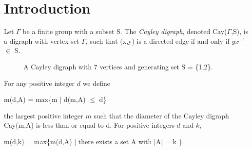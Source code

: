 \section{Introduction}

Let $\Gamma$ be a finite group with a subset S. The \emph{Cayley digraph}, denoted Cay($\Gamma$,S), is a digraph with vertex set $\Gamma$, such that (x,y) is a directed edge if and only if $yx^{-1}$ $\in$ S. 

 
\begin{figure}[h]
\begin{center}

\end{center}
\caption{ A Cayley digraph with 7 vertices and generating set S = \{1,2\}.}
\end{figure}

For any positive integer $d$ we define

\begin{center}
m(d,A) = max\{m | d(m,A) $\leq$ d\}
\end{center}

the largest positive integer $m$ such that the diameter of the Cayley digraph Cay(m,A) is less than or equal to d. For positive integers $d$ and $k$, 

\begin{center}
m(d,k) = max\{m(d,A) | there exists a set A with |A| = k \}.
\end{center}

